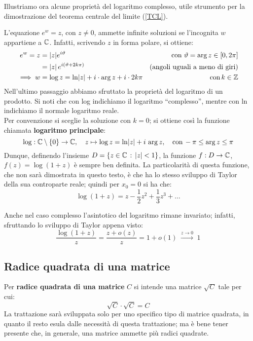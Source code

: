 Illustriamo ora alcune proprietà del logaritmo complesso, utile strumento per la dimostrazione del teorema centrale del limite (\ref{TCL}).

L'equazione $e^w = z$, con $z \neq 0$, ammette infinite soluzioni se l'incognita $w$ appartiene a $\mathbb C$.
Infatti, scrivendo $z$ in forma polare, si ottiene:
\begin{align*}
	e^w = z &= \lvert z\rvert e^{i \vartheta} &\text{con } \vartheta = \arg z \in [0,2\pi]\\
	& = \lvert z\rvert \, e^{i (\vartheta+2k\pi)} &\text{(angoli uguali a meno di giri)} \\
	\implies w & = \log z = \ln\lvert z\rvert + i \cdot \arg z + i\cdot 2k \pi &\text{con} \, k \in \mathbb Z
\end{align*}
Nell'ultimo passaggio abbiamo sfruttato la proprietà del logaritmo di un prodotto.
Si noti che con log indichiamo il logaritmo ``complesso'', mentre con ln indichiamo il normale logaritmo reale. \\
Per convenzione si sceglie la soluzione con $k = 0$; si ottiene così la funzione chiamata \textbf{logaritmo principale}:
$$\log : \mathbb C\setminus\{0\} \to \mathbb C, \quad z \mapsto \log z = \ln \lvert z\rvert + i \, \arg z, \quad \text{con} \, -\pi \leq \arg z \leq \pi$$
Dunque, definendo l'insieme $D = \{z \in \mathbb C \, : \, \lvert z\rvert < 1\}$, la funzione $f:D \to \mathbb C$, $f(z) = \log(1+z)$ è sempre ben definita.
La particolarità di questa funzione, che non sarà dimostrata in questo testo, è che ha lo stesso sviluppo di Taylor della sua controparte reale; quindi per $x_0 = 0$ si ha che:
$$\log(1+z) = z - \frac{1}{2}z^2 + \frac{1}{3}z^3 + \dots$$

\begin{nb}
	Anche nel caso complesso l'asintotico del logaritmo rimane invariato; infatti, sfruttando lo sviluppo di Taylor appena visto:
	$$\frac{\log(1+z)}{z} = \frac{z + o(z)}{z} = 1+o(1) \; \xrightarrow{z \to 0} \; 1$$
\end{nb}

\subsection{Radice quadrata di una matrice} \label{sqrt-C}

Per \textbf{radice quadrata di una matrice} $C$ si intende una matrice $\sqrt{C}$ tale per cui:
$$\sqrt{C} \cdot \sqrt{C} = C $$
La trattazione sarà sviluppata solo per uno specifico tipo di matrice quadrata, in quanto il resto esula dalle necessità di questa trattazione; ma è bene tener presente che, in generale, una matrice ammette più radici quadrate.

